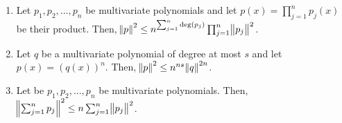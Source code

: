 \begin{lemma}
\label{lemma:properties-of-norm-of-polynomials}
\hspace{1cm} %
\begin{enumerate}
\item Let $p_1, p_2, \dots, p_n$ be multivariate polynomials and let $p(x) =
\prod_{j=1}^n p_j(x)$ be their product.  Then, $\norm{p}^2 \le n^{\sum_{j=1}^n
\deg(p_j)} \prod_{j=1}^n \norm{p_j}^2$.

\item Let $q$ be a multivariate polynomial of degree at most $s$ and let $p(x) =
(q(x))^n$. Then, $\norm{p}^2 \le n^{ns} \norm{q}^{2n}$.

\item Let be $p_1, p_2, \dots, p_n$ be multivariate polynomials. Then,
$\norm{\sum_{j=1}^n p_j}^2 \le n \sum_{j=1}^n \norm{p_j}^2$.
\end{enumerate}
\end{lemma}

